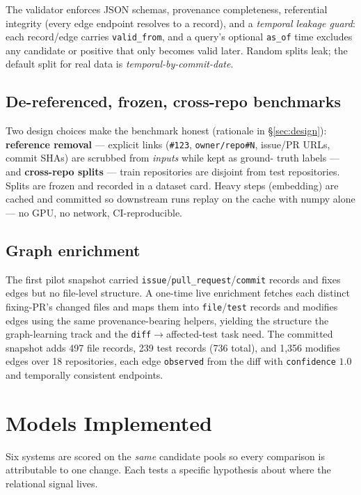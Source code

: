 \documentclass[11pt]{article}
\newcommand{\code}[1]{\texttt{#1}}
\newcommand{\rel}[1]{\textsf{#1}}
\begin{document}
The validator enforces JSON schemas, provenance completeness, referential integrity
(every edge endpoint resolves to a record), and a \emph{temporal leakage guard}:
each record/edge carries \code{valid\_from}, and a query's optional \code{as\_of}
time excludes any candidate or positive that only becomes valid later. Random splits
leak; the default split for real data is \emph{temporal-by-commit-date}.

\subsection{De-referenced, frozen, cross-repo benchmarks}

Two design choices make the benchmark honest (rationale in \S\ref{sec:design}):
\textbf{reference removal} --- explicit links (\code{\#123}, \code{owner/repo\#N},
issue/PR URLs, commit SHAs) are scrubbed from \emph{inputs} while kept as ground-
truth labels --- and \textbf{cross-repo splits} --- train repositories are disjoint
from test repositories. Splits are frozen and recorded in a dataset card. Heavy
steps (embedding) are cached and committed so downstream runs replay on the cache
with numpy alone --- no GPU, no network, CI-reproducible.

\subsection{Graph enrichment}

The first pilot snapshot carried \code{issue}/\code{pull\_request}/\code{commit}
records and \rel{fixes} edges but no file-level structure. A one-time live
enrichment fetches each distinct fixing-PR's changed files and maps them into
\code{file}/\code{test} records and \rel{modifies} edges using the same
provenance-bearing helpers, yielding the structure the graph-learning track and the
\code{diff}$\to$affected-test task need. The committed snapshot adds 497 file
records, 239 test records (736 total), and 1{,}356 \rel{modifies} edges over 18
repositories, each edge \code{observed} from the diff with \code{confidence} $1.0$
and temporally consistent endpoints.

\section{Models Implemented}
\label{sec:models}

Six systems are scored on the \emph{same} candidate pools so every comparison is
attributable to one change. Each tests a specific hypothesis about where the
relational signal lives.
\end{document}
